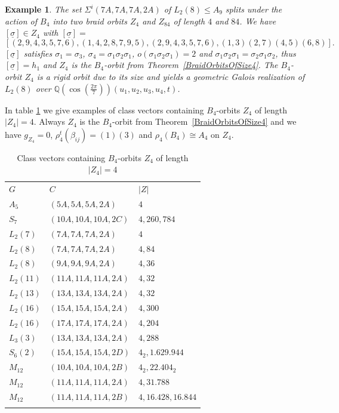 \documentclass[12pt,a4paper]{article}
\newtheorem{example}{Example}[section]
\numberwithin{equation}{section}
\numberwithin{table}{section}
\begin{document}
%
\begin{example}
\label{L2_8_7A7A7A2A_Part1}
The set $\Sigma^i(7A,7A,7A,2A)$ of $L_2(8) \leq A_9$ splits under the action of $B_4$ into
two braid orbits $Z_4$ and $Z_{84}$ of length $4$ and $84$.
We have $[\underline{\sigma}] \in Z_4$ with
$[\underline{\sigma}]=$
$$[(2,9,4,3,5,7,6), (1,4,2,8,7,9,5), (2,9,4,3,5,7,6), (1,3)(2,7)(4,5)(6,8)].$$
$[\underline{\sigma}]$ satisfies $\sigma_1 = \sigma_3$, $\sigma_4 = \sigma_1 \sigma_2 \sigma_1$,
$o(\sigma_1 \sigma_2 \sigma_1 )=2$ and $\sigma_1 \sigma_2 \sigma_1 = \sigma_2 \sigma_1 \sigma_2$,
thus $[\underline{\sigma}] = h_1$ and $Z_4$ is the $B_4$-orbit from Theorem~\ref{BraidOrbitsOfSize4}.
The $B_4$-orbit $Z_4$ is a rigid orbit due to its size and
yields a geometric Galois realization of $L_2(8)$ over $\mathbb{Q}(\cos(\frac{2\pi}{7}))(u_1,u_2,u_3,u_4,t)$.
\end{example}
%
\noindent
In table \ref{tab:Data_B4OrbitsSiz4} we give examples of class vectors containing $B_4$-orbits $Z_4$ 
of length $\vert Z_4 \vert = 4$.
Always $Z_4$ is the $B_4$-orbit from Theorem~\ref{BraidOrbitsOfSize4} and we have $g_{Z_4}=0$, $\rho^t_4(\beta_{ij}) = (1)(3)$
and $\rho_4(B_4) \cong A_4$ on $Z_4$.
%
\begin{table}[H]
\centering
\footnotesize
\captionsetup{font=footnotesize}
\caption{Class vectors containing $B_4$-orbits $Z_4$ of length $\vert Z_4 \vert = 4$}
\label{tab:Data_B4OrbitsSiz4}
\begin{tabular}{lll}
\hline\noalign{\smallskip}
$G$       & $C$                         & $ \vert Z \vert $ \\
\noalign{\smallskip}\hline\noalign{\smallskip}
$A_5$     & $(5A,5A,5A,2A)$ & $4$ \\
%
$S_7$     & $(10A,10A,10A,2C)$  & $4, 260, 784$ \\
%
$L_2(7)$  & $(7A,7A,7A,2A)$ & $4$ \\
%
$L_2(8)$  & $(7A,7A,7A,2A)$ & $4, 84$ \\
$L_2(8)$  & $(9A,9A,9A,2A)$ & $4, 36$ \\
%
$L_2(11)$ & $(11A,11A,11A,2A)$  & $4, 32$ \\
%
$L_2(13)$ & $(13A,13A,13A,2A)$  & $4, 32$ \\
%
$L_2(16)$ & $(15A,15A,15A,2A)$  & $4, 300$ \\
$L_2(16)$ & $(17A,17A,17A,2A)$  & $4, 204$ \\
%
$L_3(3)$  & $(13A,13A,13A,2A)$  & $4, 288$ \\
%
$S_6(2)$ & $(15A,15A,15A,2D)$   & $4_2, 1.629.944$ \\
%
$M_{12}$  & $(10A,10A,10A,2B)$  & $4_2, 22.404_2$ \\
$M_{12}$  & $(11A,11A,11A,2A)$  & $4, 31.788$ \\
$M_{12}$  & $(11A,11A,11A,2B)$  & $4, 16.428, 16.844$ \\
\noalign{\smallskip}\hline
\end{tabular}
\end{table}
\end{document}
